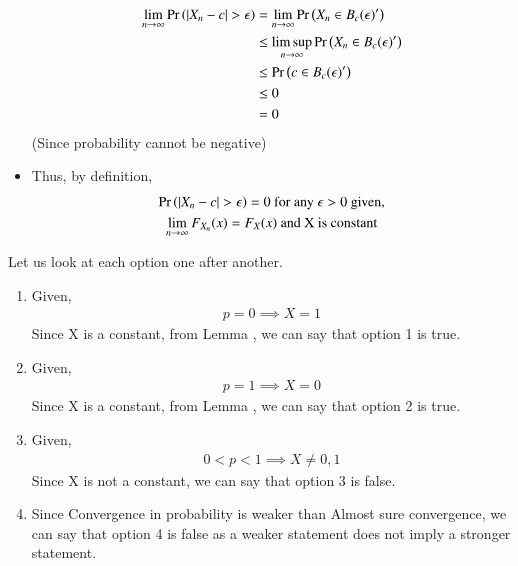 \documentclass[journal,12pt,twocolumn]{IEEEtran}
\begin{document}
\begin{itemize}
\begin{align}
            \lim_{n \rightarrow \infty}\pr{|X_n - c|>\epsilon} &= \lim_{n \rightarrow \infty}\pr{X_n \in B_c( \epsilon )^\prime} \\
            & \leq \limsup_{n \rightarrow \infty}\pr{X_n \in B_c( \epsilon )^\prime} \\
            &\leq \pr{c \in B_c( \epsilon )^\prime} \\
            &\leq 0 \\
            &= 0 
        \end{align}
        (Since probability cannot be negative)
        \item Thus, by definition,
        \begin{multline}
             \pr{|X_n-c|> \epsilon} = 0 \text{ for any }\epsilon > 0 \text{ given,} \\    
            \lim_{n \rightarrow \infty} F_{X_n}(x) = F_X(x)\text{ and X is constant}
        \end{multline}
    \end{itemize}

Let us look at each option one after another.
\begin{enumerate}
    \item Given,
    \begin{align}\nonumber
        p = 0 \implies X = 1
    \end{align}
    Since X is a constant, from Lemma , we can say that option 1 is true.
    \item Given,
      \begin{align}\nonumber
        p = 1 \implies X = 0
    \end{align}
    Since X is a constant, from Lemma , we can say that option 2 is true.
    \item Given,
      \begin{align}\nonumber
        0 < p < 1 \implies X \neq 0,1
    \end{align}
    Since X is not a constant, we can say that option 3 is false.
    \item Since Convergence in probability is weaker than Almost sure convergence, we can say that option 4 is false as a weaker statement does not imply a stronger statement.
\end{enumerate}
\end{document}
